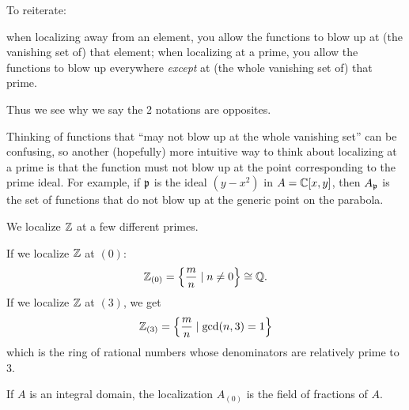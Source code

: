 \begin{remark*}
	To reiterate:
	\begin{itemize}
	\ii when localizing away from an element,
	you allow the functions to blow up at (the vanishing set of) that element;
	\ii when localizing at a prime,
	you allow the functions to blow up everywhere
	\emph{except} at (the whole vanishing set of) that prime.
	\end{itemize}
	Thus we see why we say the 2 notations are opposites.

	Thinking of functions that ``may not blow up at the whole vanishing set''
	can be confusing, so another (hopefully) more intuitive way to think
	about localizing at a prime is that the function
	must not blow up at the point corresponding to the prime ideal.
	For example, if $\mathfrak p$ is the ideal $(y-x^2)$ in $A = \mathbb C[x,y]$,
	then $A_\mathfrak p$ is the set of functions that do not blow up at the
	generic point on the parabola.
\end{remark*}

\begin{example}
	We localize $\mathbb Z$ at a few different primes.
	\begin{enumerate}[(a)]
		\ii If we localize $\mathbb Z$ at $(0)$:
		\[ \mathbb Z_{(0)} = \left\{ \frac mn \mid n \neq 0 \right\}
			\cong \mathbb Q. \]
		\ii If we localize $\mathbb Z$ at $(3)$, we get
		\[ \mathbb Z_{(3)} = \left\{ \frac mn \mid \gcd(n,3) = 1 \right\} \]
		which is the ring of rational numbers
		whose denominators are relatively prime to $3$.
	\end{enumerate}
\end{example}

\begin{example}
	If $A$ is an integral domain,
	the localization $A_{(0)}$
	is the field of fractions of $A$.
\end{example}


